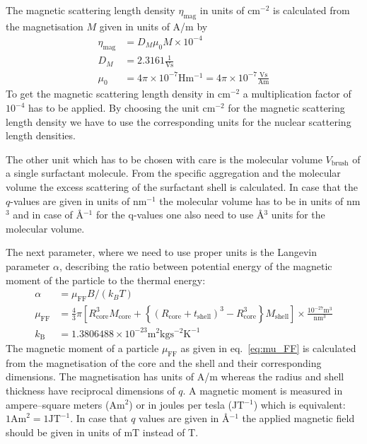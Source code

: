 The magnetic scattering length density $\eta_\text{mag}$ in units of
cm$^{-2}$ is calculated from the magnetisation $M$ given in units of
A/m by
\begin{align}
\eta_\text{mag} &= D_M \mu_0 M \label{eq:magnetic_SLD} \times 10^{-4}\\
D_M & = 2.3161 \frac{1}{\text{Vs}} \\
\mu_0 &= 4\pi \times 10^{-7} \text{H}\text{m}^{-1} = 4\pi \times 10^{-7} \frac{\text{Vs}}{\text{Am}}
\end{align}
To get the magnetic scattering length density in cm$^{-2}$ a
multiplication factor of $10^{-4}$ has to be applied. By choosing
the unit cm$^{-2}$ for the magnetic scattering length density we
have to use the corresponding units for the nuclear scattering
length densities.

The other unit which has to be chosen with care is the molecular
volume $V_\text{brush}$ of a single surfactant molecule. From the
specific aggregation and the molecular volume the excess scattering
of the surfactant shell is calculated. In case that the $q$-values
are given in units of nm$^{-1}$ the molecular volume has to be in
units of  nm$^3$ and in case of \AA$^{-1}$ for the q-values one also
need to use \AA$^{3}$ units for the molecular volume.

The next parameter, where we need to use proper units is the
Langevin parameter $\alpha$, describing the ratio between potential
energy of the magnetic moment of the particle to the thermal energy:
\begin{align}
\alpha &= \mu_\text{FF}B/(k_B T) \label{eq:alpha} \\
\mu_\text{FF} &= \frac{4}{3}\pi
\left[ R_\text{core}^3  M_\text{core} +
\left\{\left(R_\text{core}+t_\text{shell}\right)^3-R_\text{core}^3\right\} M_\text{shell}
\right] \times \frac{10^{-27}\text{m}^3}{\text{nm}^3}\label{eq:mu_FF}\\
k_\text{B} &= 1.3806488 \times 10^{-23} \text{m}^2 \text{kg} \text{
s}^{-2} \text{K}^{-1}
\end{align}
The magnetic moment of a particle $\mu_\text{FF}$ as given in eq.\
\ref{eq:mu_FF} is calculated from the magnetisation of the core and
the shell and their corresponding dimensions. The magnetisation has
units of A/m whereas the radius and shell thickness have reciprocal
dimensions of $q$. A magnetic moment is measured in ampere–square
meters (Am$^2$) or in joules per tesla (JT$^{-1}$) which is
equivalent: $1 \mathrm{Am}^2 = 1 \mathrm{JT}^{-1}$. In case that $q$
values are given in \AA$^{-1}$ the applied magnetic field should be
given in units of mT instead of T.


